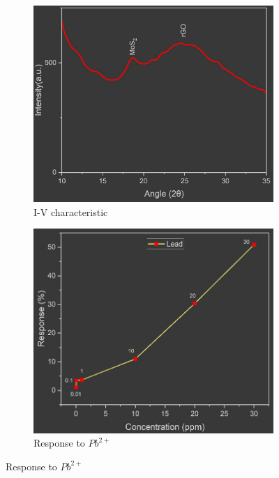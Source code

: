 \documentclass[11pt,a5paper]{article}
\begin{document}
\begin{figure}[t]
    \begin{subfigure}[b]{0.325\textwidth}
        \centering
        \includegraphics[width=\linewidth]{xrd.png}
        \caption{I-V characteristic}
    \end{subfigure}
    \hfill
    \begin{subfigure}[b]{0.325\textwidth}
        \centering
        \includegraphics[width=\linewidth]{lead_ion.png}
        \caption{Response to $Pb^{2+}$}
    \end{subfigure}
    \hfill

\end{figure}
\end{document}
